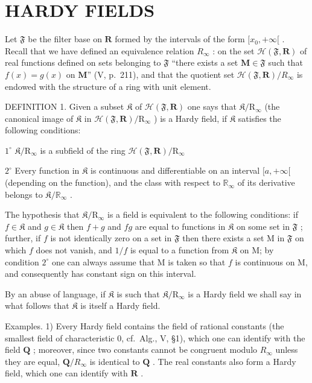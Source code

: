\section{HARDY FIELDS}

Let \(\mathfrak{F}\) be the filter base on \(\mathbf{R}\) formed by the intervals of the form \([x_0, +\infty[\) . Recall that we have defined an equivalence relation \(R_{\infty}\) : on the set \(\mathcal{H}(\mathfrak{F}, \mathbf{R})\) of real functions defined on sets belonging to \(\mathfrak{F}\) ``there exists a set \(\mathbf{M} \in \mathfrak{F}\) such that \(f(x) = g(x)\) on \(\mathbf{M}\)'' (V, p.~211), and that the quotient set \(\mathcal{H}(\mathfrak{F}, \mathbf{R}) / R_{\infty}\) is endowed with the structure of a ring with unit element.

DEFINITION 1. Given a subset \(\mathfrak{K}\) of \(\mathcal{H}(\mathfrak{F},\mathbf{R})\) one says that \(\mathfrak{K}/\mathrm{R}_{\infty}\) (the canonical image of \(\mathfrak{K}\) in \(\mathcal{H}(\mathfrak{F},\mathbf{R})/\mathrm{R}_{\infty}\) ) is a Hardy field, if \(\mathfrak{K}\) satisfies the following conditions:

\(1^{\circ}\) \(\mathfrak{K} / \mathrm{R}_{\infty}\) is a subfield of the ring \(\mathcal{H}(\mathfrak{F},\mathbf{R}) / \mathrm{R}_{\infty}\)

\(2^{\circ}\) Every function in \(\mathfrak{K}\) is continuous and differentiable on an interval \([a, +\infty[\) (depending on the function), and the class with respect to \(\mathbb{R}_{\infty}\) of its derivative belongs to \(\mathfrak{K}/\mathbb{R}_{\infty}\) .

The hypothesis that \(\mathfrak{K} / \mathrm{R}_{\infty}\) is a field is equivalent to the following conditions: if \(f\in \mathfrak{K}\) and \(g\in \mathfrak{K}\) then \(f + g\) and \(fg\) are equal to functions in \(\mathfrak{K}\) on some set in \(\mathfrak{F}\) ; further, if \(f\) is not identically zero on a set in \(\mathfrak{F}\) then there exists a set M in \(\mathfrak{F}\) on which \(f\) does not vanish, and \(1 / f\) is equal to a function from \(\mathfrak{K}\) on M; by condition \(2^{\circ}\) one can always assume that M is taken so that \(f\) is continuous on M, and consequently has constant sign on this interval.

By an abuse of language, if \(\mathfrak{K}\) is such that \(\mathfrak{K} / \mathrm{R}_{\infty}\) is a Hardy field we shall say in what follows that \(\mathfrak{K}\) is itself a Hardy field.

Examples. 1) Every Hardy field contains the field of rational constants (the smallest field of characteristic 0, cf.~Alg., V, §1), which one can identify with the field \(\mathbf{Q}\) ; moreover, since two constants cannot be congruent modulo \(R_{\infty}\) unless they are equal, \(\mathbf{Q} / R_{\infty}\) is identical to \(\mathbf{Q}\) . The real constants also form a Hardy field, which one can identify with \(\mathbf{R}\) .

